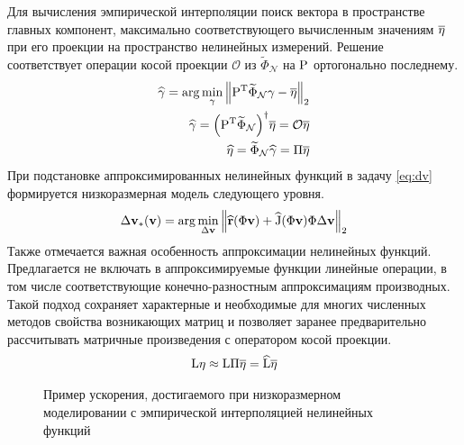Для вычисления эмпирической интерполяции поиск вектора в пространстве главных компонент, максимально соответствующего вычисленным значениям $\overline{\nlin}$ при его проекции на пространство нелинейных измерений. Решение соответствует операции косой проекции $\mathcal{O}$ из $\widetilde{\Phi}_\mathcal{N}$ на $\matr{P}$ ортогонально последнему.
\begin{align}
    \widehat{\bvec{\gamma}} = \arg \min_{\bvec{\gamma}} \norm[2]{\transpose{P} \widetilde{\Phi}_\mathcal{N} \bvec{\gamma} - \overline{\nlin}} \\
    \widehat{\bvec{\gamma}} = {\left( \transpose{P} \widetilde{\Phi}_\mathcal{N} \right)}^\dagger \overline{\nlin} = \mathcal{O} \overline{\nlin} \\
    \widehat{\nlin} = \widetilde{\Phi}_\mathcal{N} \widehat{\bvec{\gamma}} = \matr{\Pi} \overline{\nlin}
\end{align}
При подстановке аппроксимированных нелинейных функций в задачу \ref{eq:dv} формируется низкоразмерная модель следующего уровня.
\begin{align}
    \dvunk_\ast (\vunk)= \arg \min_{\dvunk} \norm[2]{\widehat{\resid}(\Phi \vunk) + \widehat{\jac}(\Phi \vunk) \Phi \dvunk}
\end{align}
Также отмечается важная особенность аппроксимации нелинейных функций. Предлагается не включать в аппроксимируемые функции линейные операции, в том числе соответствующие конечно-разностным аппроксимациям производных. Такой подход сохраняет характерные и необходимые для многих численных методов свойства возникающих матриц и позволяет заранее предварительно рассчитывать матричные произведения с оператором косой проекции.
\begin{align}
    \matr{\matr{L}} \nlin \approx
    \matr{\matr{L}} \matr{\Pi} \overline{\nlin} = \widehat{\matr{\matr{L}}} \overline{\nlin}
\end{align}

\begin{figure}[ht]
    \caption{Пример ускорения, достигаемого при низкоразмерном моделировании с эмпирической интерполяцией нелинейных функций~\cite{Elizarev2022}}\label{fig:ROM-II}
\end{figure}

